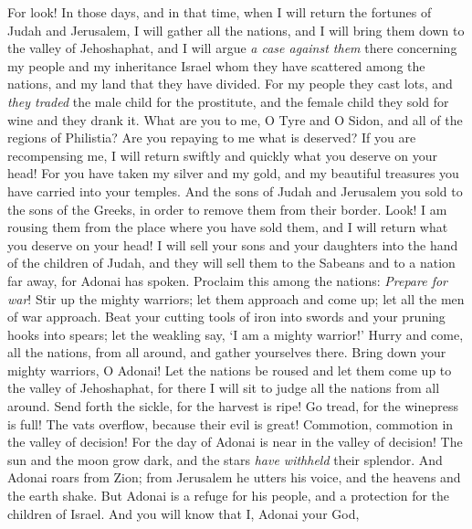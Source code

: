 \begin{biblechapter} %
  For look! In those days, and in that time, when I will return the fortunes of Judah and Jerusalem,
\verse I will gather all the nations, and I will bring them down to the valley of Jehoshaphat, and I will argue \textit{a case against them} there concerning my people and my inheritance Israel whom they have scattered among the nations, and my land that they have divided.
\verse For my people they cast lots, and \textit{they traded} the male child for the prostitute, and the female child they sold for wine and they drank it.
\verse What are you to me, O Tyre and O Sidon, and all of the regions of Philistia? Are you repaying to me what is deserved? If you are recompensing me, I will return swiftly and quickly what you deserve on your head!
\verse For you have taken my silver and my gold, and my beautiful treasures you have carried into your temples.
\verse And the sons of Judah and Jerusalem you sold to the sons of the Greeks, in order to remove them from their border.
\verse Look! I am rousing them from the place where you have sold them, and I will return what you deserve on your head!
\verse I will sell your sons and your daughters into the hand of the children of Judah, and they will sell them to the Sabeans and to a nation far away, for Adonai has spoken.
 Proclaim this among the nations: 
\textit{Prepare for war}! 
Stir up the mighty warriors; 
let them approach and come up; 
let all the men of war approach.
\verse Beat your cutting tools of iron into swords 
and your pruning hooks into spears; 
let the weakling say, ‘I am a mighty warrior!’
\verse Hurry and come, 
all the nations, from all around, 
and gather yourselves there. 
Bring down your mighty warriors, O Adonai!
\verse Let the nations be roused and let them come up 
to the valley of Jehoshaphat, 
for there I will sit to judge 
all the nations from all around.
\verse Send forth the sickle, 
for the harvest is ripe! 
Go tread, 
for the winepress is full! 
The vats overflow, 
because their evil is great!
\verse Commotion, commotion 
in the valley of decision! 
For the day of Adonai is near 
in the valley of decision!
\verse The sun and the moon grow dark, 
and the stars \textit{have withheld} their splendor.
\verse And Adonai roars from Zion; 
from Jerusalem he utters his voice, 
and the heavens and the earth shake. 
But Adonai is a refuge for his people, 
and a protection for the children of Israel.
\verse And you will know that I, Adonai your God, 

\end{biblechapter}
